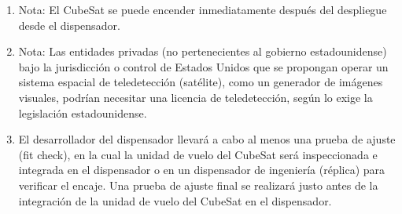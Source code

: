 \documentclass[11pt,a4paper,twoside]{report}
\begin{document}
\begin{enumerate}
		\item Nota: El CubeSat se puede encender inmediatamente después del despliegue desde el dispensador.
		
		\item Nota: Las entidades privadas (no pertenecientes al gobierno estadounidense) bajo la jurisdicción o control de Estados Unidos que se propongan operar un sistema espacial de teledetección (satélite), como un generador de imágenes visuales, podrían necesitar una licencia de teledetección, según lo exige la legislación estadounidense.
		
		\item El desarrollador del dispensador llevará a cabo al menos una prueba de ajuste (fit check), en la cual la unidad de vuelo del CubeSat será inspeccionada e integrada en el dispensador o en un dispensador de ingeniería (réplica) para verificar el encaje. Una prueba de ajuste final se realizará justo antes de la integración de la unidad de vuelo del CubeSat en el dispensador.
	\end{enumerate}
	
\end{document}
